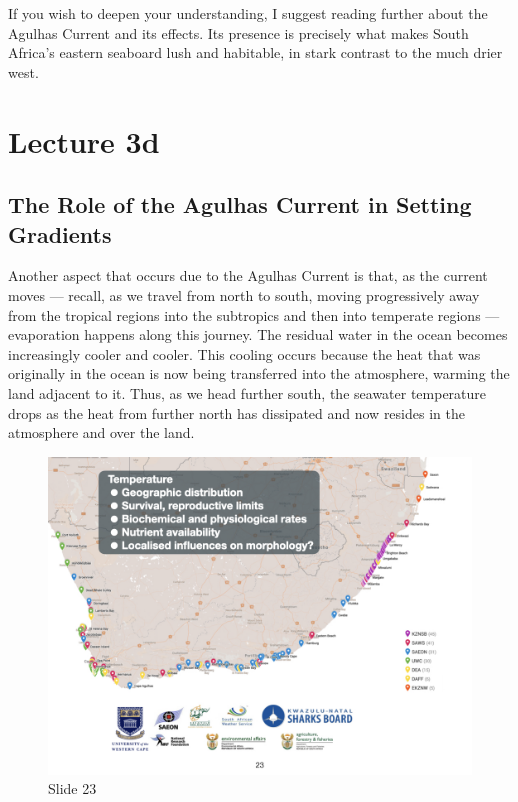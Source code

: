 \documentclass[
  12pt,
]{book}
\begin{document}
If you wish to deepen your understanding, I suggest reading further
about the Agulhas Current and its effects. Its presence is precisely
what makes South Africa's eastern seaboard lush and habitable, in stark
contrast to the much drier west.

\chapter*{Lecture 3d}\label{lecture-3d}

\section{The Role of the Agulhas Current in Setting
Gradients}\label{the-role-of-the-agulhas-current-in-setting-gradients}

Another aspect that occurs due to the Agulhas Current is that, as the
current moves --- recall, as we travel from north to south, moving
progressively away from the tropical regions into the subtropics and
then into temperate regions --- evaporation happens along this journey.
The residual water in the ocean becomes increasingly cooler and cooler.
This cooling occurs because the heat that was originally in the ocean is
now being transferred into the atmosphere, warming the land adjacent to
it. Thus, as we head further south, the seawater temperature drops as
the heat from further north has dissipated and now resides in the
atmosphere and over the land.

\begin{figure}[ht]
\centering
\includegraphics[width=0.8\linewidth]{../images/BDC334/BDC334-023.jpeg}
\caption*{Slide 23}
\end{figure}
\end{document}
